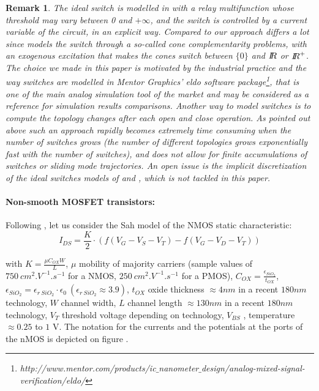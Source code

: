 \documentclass{article}
\newtheorem{remark}{Remark}
\newcommand{\RR}{\mbox{\rm $I\!\!R$}}
\begin{document}
\begin{remark}
  The  ideal switch is modelled in \cite{glocker2005} with a relay multifunction whose threshold may vary between 0 and $+\infty$, and the switch is controlled by a current variable of the circuit, in an explicit way. Compared to \cite{vasca2009} our approach differs a lot since \cite{vasca2009} models the switch through a so-called cone complementarity problems, with an exogenous excitation that makes the cones switch between $\{0\}$ and $\RR$ or $\RR^{+}$. The choice we made in this paper is motivated by the industrial practice and the way switches are modelled in Mentor Graphics' {\sc eldo} software package\footnote{http://www.mentor.com/products/ic$\_$nanometer$\_$design/analog-mixed-signal-verification/eldo/}, that is one of the main analog simulation tool of the market and may be considered as a reference for simulation results comparisons. Another way to model switches is to compute the topology changes after each open and close operation. As pointed out above such an approach rapidly becomes extremely time consuming when the number of switches grows (the number of different topologies grows exponentially fast with the number of switches), and does not allow for finite accumulations of switches or sliding mode trajectories. An open issue is the implicit discretization of the ideal switches models of \cite{glocker2005} and \cite{vasca2009}, which is not tackled in this paper. 
\end{remark}


\paragraph{Non-smooth MOSFET transistors:} Following \cite{leenaerts-bokhoven1998}, let us consider the Sah model of the NMOS static characteristic:
\begin{equation}
  \label{eq:MOS_LEE_VAN}
I_{DS} = \frac{K}{2} \cdot (f(V_G-V_S-V_T) - f(V_G-V_D-V_T))
\end{equation}


with $K = \frac{\mu C_{OX} W}{L}$, $\mu$ mobility of majority carriers (sample values of $750~cm^2.V^{-1}.s^{-1}$ for a NMOS, $250~cm^2.V^{-1}.s^{-1}$ for a PMOS), $C_{OX} = \frac{\epsilon_{SiO_2}}{t_{OX}}$, $\epsilon_{SiO_2} = \epsilon_{r~SiO_2} \cdot \epsilon_0 \ (\epsilon_{r~SiO_2} \approx 3.9)$, $t_{OX}$ oxide thickness $\approx 4 nm$ in a recent $180 nm$ technology, $W$ channel width, $L$ channel length $\approx 130 nm$ in a recent $180 nm$ technology, $V_T$ threshold voltage depending on technology, $V_{BS}$ , temperature $\approx 0.25$ to $1$ V. The notation for the currents and the potentials at the ports of the nMOS is depicted on figure \cite{fig:NMOS}. 
\end{document}
